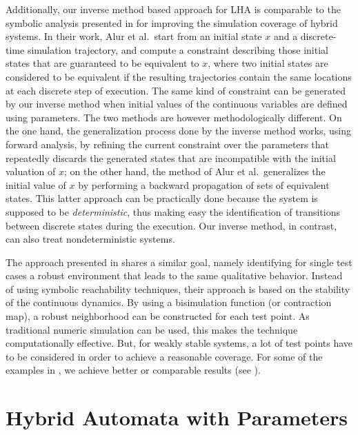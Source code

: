 \documentclass{llncs}
\begin{document}
Additionally, our inverse method based approach for LHA is comparable
to the symbolic analysis presented in \cite{AKRS:2008} for improving
the simulation coverage of hybrid systems.  In their work, Alur et
al.~start from an initial state $x$ and a discrete-time simulation
trajectory, and compute a constraint describing those initial states
that are guaranteed to be equivalent to $x$, where two initial states
are considered to be equivalent if the resulting trajectories contain
the same locations at each discrete step of execution.  The same kind
of constraint can be generated by our inverse method when initial
values of the continuous variables are defined using parameters. The
two methods are however methodologically different.  On the one hand,
the generalization process done by the inverse method works, using
forward analysis, by refining the current constraint over the
parameters that repeatedly discards the generated states that are
incompatible with the initial valuation of $x$; on the other hand, the
method of Alur et al.~generalizes the initial value of $x$ by
performing a backward propagation of sets of equivalent states. This
latter approach can be practically done because the system is supposed
to be {\em deterministic}, thus making easy the identification of
transitions between discrete states during the execution. Our inverse
method, in contrast, can also treat nondeterministic systems.

The approach presented in \cite{JFG+:2007} shares a similar goal,
namely identifying for single test cases a robust environment that
leads to the same qualitative behavior. Instead of using symbolic
reachability techniques, their approach is based on the stability of
the continuous dynamics. By using a bisimulation function (or
contraction map), a robust neighborhood can be constructed for each
test point. As traditional numeric simulation can be used, this makes
the technique computationally effective. But, for weakly stable
systems, a lot of test points have to be considered in order to
achieve a reasonable coverage. For some of the examples in
\cite{JFG+:2007}, we achieve better or comparable results
(see \cite{FK:2011}).




\section{Hybrid Automata with Parameters} \label{sec:lha}
\end{document}
